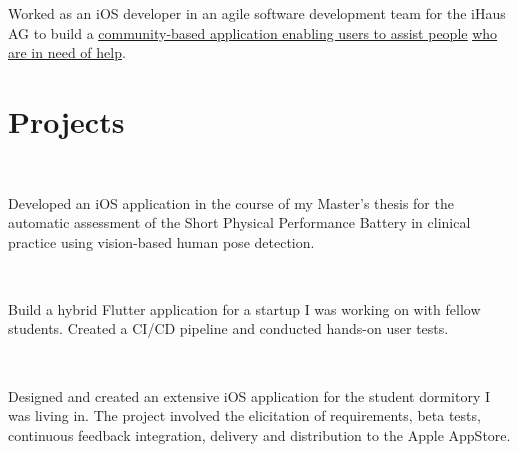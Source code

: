 \documentclass[]{cv}
\begin{document}
\begin{minipage}[t]{0.70\textwidth}
\begin{tightemize}
\sectionsep
\item Worked as an iOS developer in an agile software development team for the iHaus AG to build a \href{https://youtu.be/Hd8rgOIprww?feature=shared}{\underline{community-based application enabling users to assist people}} \href{https://youtu.be/Hd8rgOIprww?feature=shared}{\underline{who are in need of help}}.
\end{tightemize}
\sectionsep



\section{Projects}

\\
\begin{tightemize}
\item Developed an iOS application in the course of my Master's thesis for the automatic assessment of the Short Physical Performance Battery in clinical practice using vision-based human pose detection.
\end{tightemize}
\sectionsep

\\
\begin{tightemize}
\item Build a hybrid Flutter application for a startup I was working on with fellow students. Created a CI/CD pipeline and conducted hands-on user tests.
\end{tightemize}
\sectionsep

\\
\begin{tightemize}
\item Designed and created an extensive iOS application for the student dormitory I was living in. The project involved the elicitation of requirements, beta tests, continuous feedback integration, delivery and distribution to the Apple AppStore.
\end{tightemize}
\sectionsep


\end{minipage}
\end{document}
